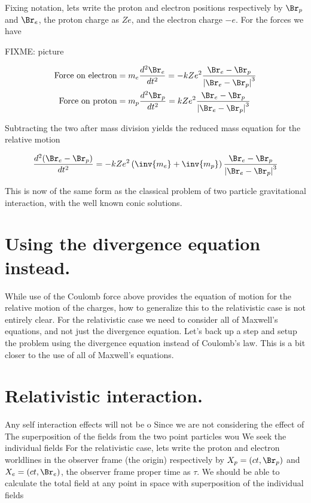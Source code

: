 Fixing notation, lets write the proton and electron positions respectively by $\Br_p$ and $\Br_e$, the proton charge as $Z e$, and the electron charge $-e$.  For the forces we have

FIXME: picture

\begin{align}\label{eqn:nuclearInteraction:hoo1}
\text{Force on electron} &= m_e \frac{d^2 \Br_e}{dt^2} = - k Z e^2 \frac{\Br_e - \Br_p}{\Abs{\Br_e - \Br_p}^3} \\
\text{Force on proton} &= m_p \frac{d^2 \Br_p}{dt^2} = k Z e^2 \frac{\Br_e - \Br_p}{\Abs{\Br_e - \Br_p}^3}
\end{align}

Subtracting the two after mass division yields the reduced mass equation for the relative motion

\begin{align}\label{eqn:nuclearInteraction:hoo2}
\frac{d^2 (\Br_e -\Br_p)}{dt^2} = - k Z e^2 \left( \inv{m_e} + \inv{m_p}\right) \frac{\Br_e - \Br_p}{\Abs{\Br_e - \Br_p}^3} 
\end{align}

This is now of the same form as the classical problem of two particle gravitational interaction, with the well known conic solutions.

\section{Using the divergence equation instead.}

While use of the Coulomb force above provides the equation of motion for the relative motion of the charges, how to generalize this to the relativistic case is not entirely clear.  For the relativistic case we need to consider all of Maxwell's equations, and not just the divergence equation.  Let's back up a step and setup the problem using the divergence equation instead of Coulomb's law.  This is a bit closer to the use of all of Maxwell's equations.

\section{Relativistic interaction.}

Any self interaction effects will not be o
Since we are not considering the effect of 
The superposition of the fields from the two point particles wou
We seek the individual fields 
For the relativistic case, lets write the proton and electron worldlines in the observer frame (the origin) respectively by $X_p = (ct, \Br_p)$ and $X_e = (ct,\Br_e)$, the observer frame proper time as $\tau$.  We should be able to calculate the total field at any point in space with superposition of the individual fields

